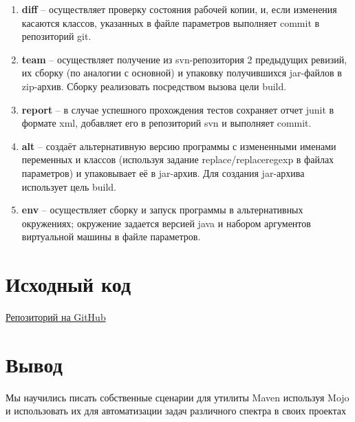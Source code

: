 \documentclass[12pt,a4paper]{article}
\begin{document}
\begin{enumerate}
    \item \textbf{diff} -- осуществляет проверку состояния рабочей копии, и, если изменения касаются классов, указанных в файле параметров выполняет commit в репозиторий git.
    \item \textbf{team} -- осуществляет получение из svn-репозитория 2 предыдущих ревизий, их сборку (по аналогии с основной) и упаковку получившихся jar-файлов в zip-архив. Сборку реализовать посредством вызова цели build.
    \item \textbf{report} -- в случае успешного прохождения тестов сохраняет отчет junit в формате xml, добавляет его в репозиторий svn и выполняет commit.
    \item \textbf{alt} -- создаёт альтернативную версию программы с измененными именами переменных и классов (используя задание replace/replaceregexp в файлах параметров) и упаковывает её в jar-архив. Для создания jar-архива использует цель build.
    \item \textbf{env} -- осуществляет сборку и запуск программы в альтернативных окружениях; окружение задается версией java и набором аргументов виртуальной машины в файле параметров.
\end{enumerate}
\section*{Исходный код}
\href{https://github.com/Armemius/ItmoStuff/tree/main/fse/lab3}{Репозиторий на GitHub} 
\section*{Вывод}
Мы научились писать собственные сценарии для утилиты Maven используя Mojo и использовать их для автоматизации задач различного спектра в своих проектах
\end{document}
